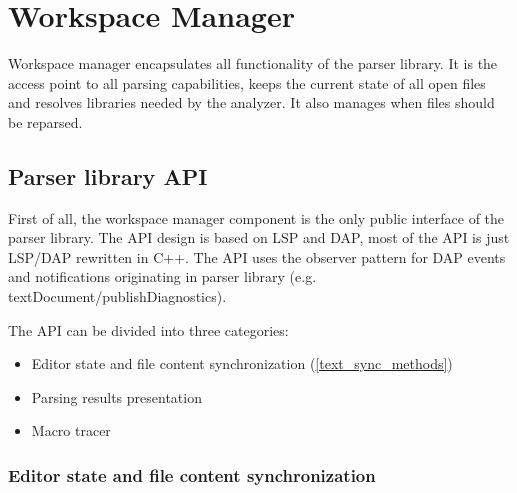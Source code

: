 \chapter{Workspace Manager}

Workspace manager encapsulates all functionality of the parser library. It is the access point to all parsing capabilities, keeps the current state of all open files and resolves libraries needed by the analyzer. It also manages when files should be reparsed.

\section{Parser library API}

First of all, the workspace manager component is the only public interface of the parser library. The API design is based on LSP and DAP, most of the API is just LSP/DAP rewritten in C++. The API uses the observer pattern for DAP events and notifications originating in parser library (e.g. textDocument/publishDiagnostics).

The API can be divided into three categories:
\begin{itemize}
	\item Editor state and file content synchronization (\cref{text_sync_methods})
	\item Parsing results presentation 
	\item Macro tracer
\end{itemize}

\subsection{Editor state and file content synchronization}

